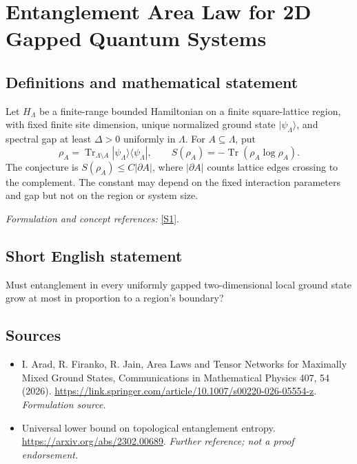 \documentclass[11pt]{article}
\begin{document}
\section*{\texorpdfstring{Entanglement Area Law for 2D Gapped Quantum Systems}{Entanglement Area Law for 2D Gapped Quantum Systems}}\label{93}
\subsection{Definitions and mathematical statement}
Let $H_\Lambda$ be a finite-range bounded Hamiltonian on a finite square-lattice region, with fixed finite site dimension, unique normalized ground state $|\psi_\Lambda\rangle$, and spectral gap at least $\Delta>0$ uniformly in $\Lambda$. For $A\subseteq\Lambda$, put
\[
 \rho_A=\operatorname{Tr}_{\Lambda\setminus A}|\psi_\Lambda\rangle\langle\psi_\Lambda|,
 \qquad S(\rho_A)=-\operatorname{Tr}(\rho_A\log\rho_A).
\]
The conjecture is $S(\rho_A)\le C|\partial A|$, where $|\partial A|$ counts lattice edges crossing to the complement. The constant may depend on the fixed interaction parameters and gap but not on the region or system size.
\par\smallskip\textit{Formulation and concept references:} \href{https://link.springer.com/article/10.1007/s00220-026-05554-z}{[S1]}.

\subsection{Short English statement}
Must entanglement in every uniformly gapped two-dimensional local ground state grow at most in proportion to a region's boundary?
\subsection{Sources}
\begin{itemize}
\item[S1]I. Arad, R. Firanko, R. Jain, Area Laws and Tensor Networks for Maximally Mixed Ground States, Communications in Mathematical Physics 407, 54 (2026).
\url{https://link.springer.com/article/10.1007/s00220-026-05554-z}.
\textit{Formulation source.}
\item[S2]Universal lower bound on topological entanglement entropy.
\url{https://arxiv.org/abs/2302.00689}.
\textit{Further reference; not a proof endorsement.}
\end{itemize}
\end{document}
